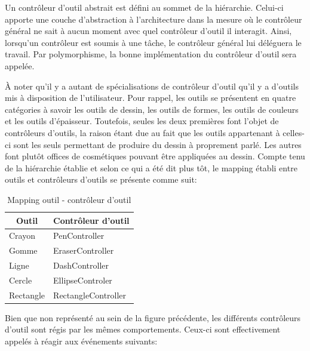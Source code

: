 \documentclass[11pt,a4paper,oldfontcommands]{memoir}
\begin{document}
Un contrôleur d'outil abstrait est défini au sommet de la hiérarchie. Celui-ci apporte une couche d'abstraction à l'architecture dans la mesure où le contrôleur général ne sait à aucun moment avec quel contrôleur d'outil il interagit. Ainsi, lorsqu'un contrôleur est soumis à une tâche, le contrôleur général lui déléguera le travail. Par polymorphisme, la bonne implémentation du contrôleur d'outil sera appelée.

À noter qu'il y a autant de spécialisations de contrôleur d'outil qu'il y a d'outils mis à disposition de l'utilisateur. Pour rappel, les outils se présentent en quatre catégories à savoir les outils de dessin, les outils de formes, les outils de couleurs et les outils d'épaisseur. Toutefois, seules les deux premières font l'objet de contrôleurs d'outils, la raison étant due au fait que les outils appartenant à celles-ci sont les seuls permettant de produire du dessin à proprement parlé. Les autres font plutôt offices de cosmétiques pouvant être appliquées au dessin. Compte tenu de la hiérarchie établie et selon ce qui a été dit plus tôt, le mapping établi entre outils et contrôleurs d'outils se présente comme suit:

\begin{table}[h]
\centering
\begin{tabular}{|l|l|}
\hline
\multicolumn{1}{|c|}{\textbf{Outil}} & \multicolumn{1}{c|}{\textbf{Contrôleur d'outil}} \\ \hline
Crayon                               & PenController                                    \\ \hline
Gomme                                & EraserController                                 \\ \hline
Ligne                                & DashController                                   \\ \hline
Cercle                               & EllipseControler                                 \\ \hline
Rectangle                            & RectangleController                              \\ \hline
\end{tabular}
\caption{Mapping outil - contrôleur d'outil}
\end{table}

Bien que non représenté au sein de la figure précédente, les différents contrôleurs d'outil sont régis par les mêmes comportements. Ceux-ci sont effectivement appelés à réagir aux événements suivants:
\end{document}

